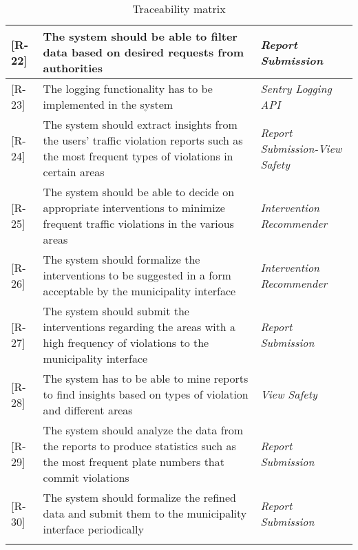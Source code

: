 \begin{longtable}{| p{} |p{} | p{} |}
 [R-22] & The system should be able to filter data based on desired requests from authorities & \emph{Report Submission} 		\\ \hline

 [R-23] & The logging functionality has to be implemented in the system & \emph{Sentry Logging API} 		\\ \hline

 [R-24] &  The system should extract insights from the users’ traffic violation reports such as the most frequent types of violations in certain areas & \emph{Report Submission-View Safety} 		\\ \hline

 [R-25] & The system should be able to decide on appropriate interventions to minimize frequent traffic violations in the various areas
 & \emph{Intervention Recommender} 		\\ \hline

 [R-26] & The system should formalize the interventions to be suggested in a form acceptable by the municipality interface & \emph{Intervention Recommender} 		\\ \hline

 [R-27] & The system should submit the interventions regarding the areas with a high frequency of violations to the municipality interface & \emph{Report Submission} 		\\ \hline

 [R-28] & The system has to be able to mine reports to find insights based on types of violation and different areas & \emph{View Safety} 		\\ \hline

 [R-29] & The system should analyze the data from the reports to produce statistics such as the most frequent plate numbers that commit violations & \emph{Report Submission} 		\\ \hline

 [R-30] & The system should formalize the refined data and submit them to the municipality interface periodically & \emph{Report Submission} 		 \\ \hline

\caption{Traceability matrix}
\label{tab:Usecase-View-Safety}
\end{longtable}
